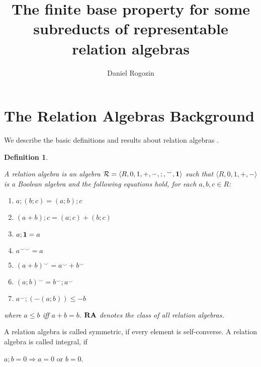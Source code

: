 \documentclass[a4paper]{article}
\author{Daniel Rogozin}
\date{}
\title{The finite base property for some subreducts of representable relation algebras}
\theoremstyle{defin}
\newtheorem{defin}{Definition}
\theoremstyle{theorem}
\theoremstyle{prop}
\theoremstyle{lemma}
\theoremstyle{ex}
\theoremstyle{col}
\begin{document}
\maketitle

\section{The Relation Algebras Background}

We describe the basic definitions and results about relation algebras \cite{hirsch2002relation} \cite{maddux2006relation}.

\begin{defin}
  $ $

    A relation algebra is an algebra $\mathcal{R} = \langle R, 0, 1, +, -, ;, {}^{\smile}, {\bf 1 }\rangle$ such that $\langle R, 0, 1, +, - \rangle$ is a Boolean algebra and the following
    equations hold, for each $a, b, c \in R$:
    \begin{enumerate}
      \item $a ; (b ; c) = (a ; b) ; c$
      \item $(a + b) ; c = (a ; c) + (b ; c)$
      \item $a ; {\bf 1} = a$
      \item $a^{\smile \smile} = a$
      \item $(a + b)^{\smile} = a^{\smile} + b^{\smile}$
      \item $(a ; b)^{\smile} = b^{\smile} ; a^{\smile}$
      \item $a^{\smile} ; (- (a ; b)) \leq - b$
    \end{enumerate}
    where $a \leq b$ iff $a + b = b$. ${\bf RA}$ denotes the class of all relation
    algebras.
\end{defin}
A relation algebra is called symmetric, if every element is self-converse. A relation algebra is called integral, if
\begin{center}
  $a ; b = 0 \Rightarrow a = 0 \text{ or } b = 0$.
\end{center}
\end{document}
